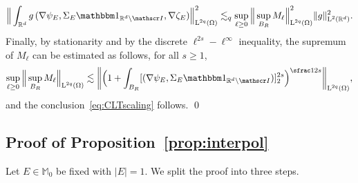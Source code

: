 \documentclass[10pt]{amsart}
\let\mathcal\mathscr
\let\mathds\mathbbm
\theoremstyle{plain}
\theoremstyle{definition}
\newcommand{\R}{\mathbb R}
\newcommand{\Ic}{\mathcal I}
\newcommand{\Md}{\mathbb M}
\newcommand{\Ld}{\operatorname{L}}
\begin{document}
\begin{equation*}
\Big\|\int_{\R^d}g\,(\nabla \psi_E,\Sigma_E\mathds1_{\R^d\setminus\Ic},\nabla\zeta_E)\Big\|_{\Ld^{2q}(\Omega)}^{2}
\lesssim_q \sup_{\ell\ge0}\Big\|\sup_{B_R}M_\ell\Big\|_{\Ld^{2q}(\Omega)}^2\| g\|_{\Ld^2(\R^d)}^2.
\end{equation*}
Finally, by stationarity and by the discrete $\ell^{2s}-\ell^\infty$ inequality, the supremum of $M_\ell$ can be estimated as follows, for all $s\ge1$,
\begin{equation*}
\sup_{\ell\ge0}\Big\|\sup_{B_R}M_\ell\Big\|_{\Ld^{2q}(\Omega)}\lesssim \bigg\|\Big(1+\int_{B_{R}}[(\nabla\psi_E,\Sigma_E\mathds1_{\R^d\setminus\Ic})]_2^{2s}\Big)^{\sfrac1{2s}}\bigg\|_{\Ld^{2q}(\Omega)},
\end{equation*}
and the conclusion~\eqref{eq:CLTscaling} follows.
\qed

\subsection{Proof of Proposition~\ref{prop:interpol}}
Let $E\in\Md_0$ be fixed with $|E|=1$.
We split the proof into three steps.
\end{document}
